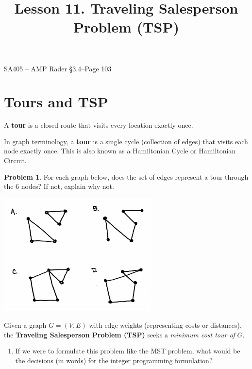 \documentclass[11pt]{article}
\makeatletter
\theoremstyle{definition}
\newtheorem{problem}{Problem}
\renewcommand{\maketitle}{
  \noindent SA405 -- AMP \hfill Rader \S 3.4--Page 103 \\

  \begin{center}\Large{\textbf{\@title}}\end{center}
}
\makeatother
\begin{document}
  
\title{Lesson 11.  Traveling Salesperson Problem (TSP)}

\maketitle

\section{Tours and TSP}

\begin{tcolorbox}
A \textbf{tour} is a closed route that visits every location exactly once.

\smallskip
In graph terminology, a \textbf{tour} is a single cycle (collection of edges) that visits each node exactly once. This is also known as a Hamiltonian Cycle or Hamiltonian Circuit.
\end{tcolorbox}

\begin{problem}
For each graph below, does the set of edges represent a tour through the 6 nodes?  If not, explain why not.

\begin{center}
\includegraphics[width=0.6\textwidth]{tours}
\end{center}
\end{problem}

\begin{tcolorbox}
Given a graph $G = (V, E)$ with edge weights (representing costs or distances), the \textbf{Traveling Salesperson Problem (TSP)} seeks a \emph{minimum cost tour of} $G$.
\end{tcolorbox}

\begin{enumerate}
\item If we were to formulate this problem like the MST problem, what would be the decisions (in words) for the integer programming formulation?
\end{enumerate}
\end{document}
